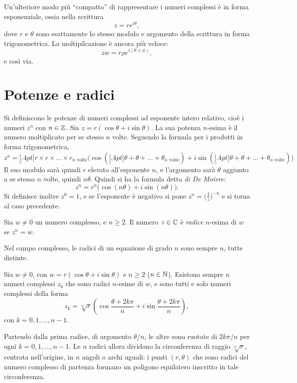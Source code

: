 Un'ulteriore modo più ``compatto'' di rappresentare i numeri complessi è in forma esponenziale, ossia nella scrittura
\[
z=re^{i\theta},
\]
dove $r$ e $\theta$ sono esattamente lo stesso modulo e argomento della scrittura in forma trigonometrica. La moltipilcazione è ancora più veloce:
\[
zw=r\rho e^{i(\theta+\phi)},
\]
e così via.
\section{Potenze e radici}
Si definiscono le potenze di numeri complessi ad esponente intero relativo, cioè i numeri $z^n$ con $n\in\mathbb{Z}$.
Sia $z=r(\cos\theta+i\sin\theta)$. La sua potenza $n$-esima è il numero moltiplicato per se stesso $n$ volte. Seguendo la formula per i prodotti in forma trigonometrica,
\[
z^n=\underbracket[.4pt]{r\times r\times\dots\times r}_\text{$n$ volte}\big(\!\cos(\underbracket[.4pt]{\theta+\theta+\dots+\theta}_\text{$n$ volte})+i\sin(\underbracket[.4pt]{\theta+\theta+\dots+\theta}_\text{$n$ volte})\big)
\]
Il suo modulo sarà quindi $r$ elevato all'esponente $n$, e l'argomento sarà $\theta$ aggiunto a se stesso $n$ volte, quindi $n\theta$. Quindi si ha la formula detta \emph{di De Moivre}:
\begin{equation}
\label{eq:demoivre}
z^n=r^n\big(\!\cos(n\theta)+i\sin(n\theta)\big).
\end{equation}
Si definisce inoltre $z^0=1$, e se l'esponente è negativo si pone $z^n=\big(\frac1{z}\big)^{-n}$ e si torna al caso precedente.
\begin{definizione}
\label{d:radici-c}
Sia $w\neq 0$ un numero complesso, e $n\geq 2$. Il numero $z\in\mathbb{C}$ è \emph{radice} $n$-esima di $w$ se $z^n=w$.
\end{definizione}
Nel campo complesso, le radici di un equazione di grado $n$ sono sempre $n$, tutte distinte.
\begin{teorema}
\label{t:radici-c}
Sia $w\neq 0$, con $w=r(\cos\theta+i\sin\theta)$ e $n\geq 2$ ($n\in\mathbb{N}$). Esistono sempre $n$ numeri complessi $z_k$ che sono radici $n$-esime di $w$, e sono tutti e solo numeri complessi della forma
\begin{equation}
\label{eq:radici-c}
z_k=\sqrt[n]{r}\left(\cos\frac{\theta+2k\pi}{n}+i\sin\frac{\theta+2k\pi}{n}\right),
\end{equation}
con $k=0,1,\dots,n-1$.
\end{teorema}
Partendo dalla prima radice, di argomento $\theta/n$, le altre sono ruotate di $2k\pi/n$ per ogni $k=0,1,\dots,n-1$.
Le $n$ radici allora dividono la circonferenza di raggio $\sqrt[n]{r}$, centrata nell'origine, in $n$ angoli o archi uguali: i punti $(r,\theta)$ che sono radici del numero complesso di partenza formano un poligono equilatero inscritto in tale circonferenza.


